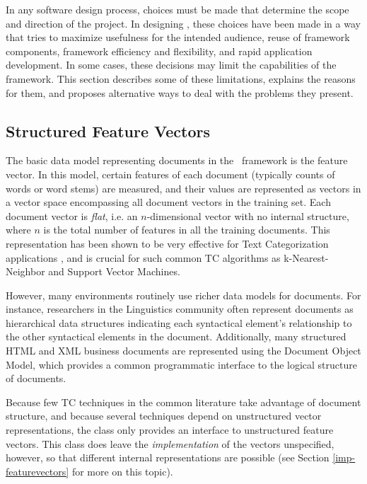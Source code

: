 In any software design process, choices must be made that determine
the scope and direction of the project.  In designing \aicat, these
choices have been made in a way that tries to maximize usefulness for
the intended audience, reuse of framework components, framework
efficiency and flexibility, and rapid application development.  In
some cases, these decisions may limit the capabilities of the
framework.  This section describes some of these limitations, explains
the reasons for them, and proposes alternative ways to deal with the
problems they present.

\subsection{Structured Feature Vectors}

The basic data model representing documents in the \aicat\ framework
is the feature vector.  In this model, certain features of each
document (typically counts of words or word stems) are measured, and
their values are represented as vectors in a vector space encompassing
all document vectors in the training set.  Each document vector is
\emph{flat}, i.e. an $n$-dimensional vector with no internal
structure, where $n$ is the total number of features in all the
training documents.  This representation has been shown to be very
effective for Text Categorization applications
\cite[p. 10]{sebastiani:02}, and is crucial for such common TC
algorithms as k-Nearest-Neighbor and Support Vector Machines.

However, many environments routinely use richer data models for
documents.  For instance, researchers in the Linguistics community
often represent documents as hierarchical data structures indicating
each syntactical element's relationship to the other syntactical
elements in the document. \cite[ch. 11 \& 12]{manning:99} \cite{sag:99}
Additionally, many structured HTML and XML business documents are
represented using the Document Object Model, which provides a common
programmatic interface to the logical structure of
documents. \cite{dom}

Because few TC techniques in the common literature take advantage of
document structure, and because several techniques depend on
unstructured vector representations, the  class
only provides an interface to unstructured feature vectors.  This
class does leave the \emph{implementation} of the vectors unspecified,
however, so that different internal representations are possible (see
Section \ref{imp-featurevectors} for more on this topic).

